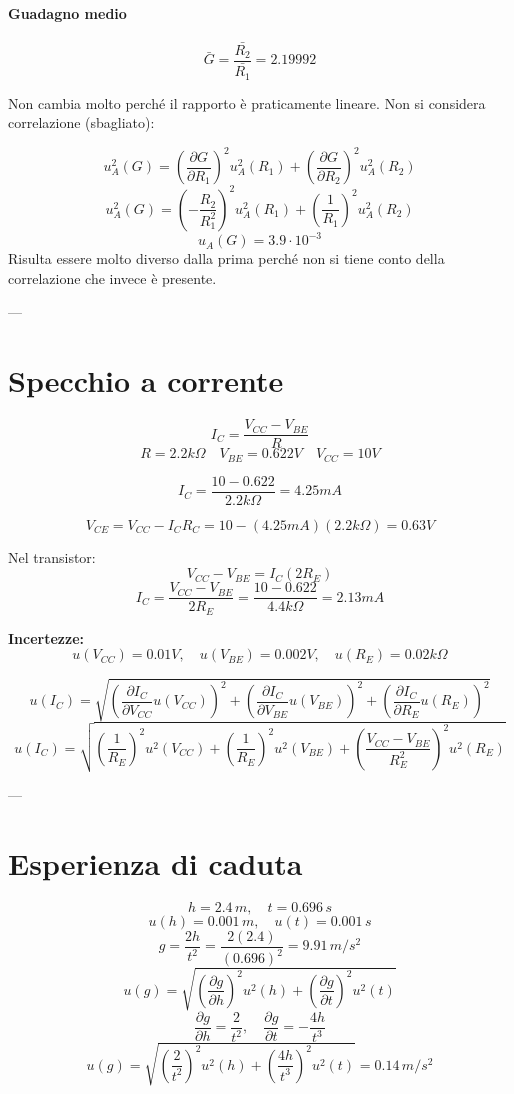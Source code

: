 \paragraph{Guadagno medio}
\[
\bar{G} = \frac{\bar{R_2}}{\bar{R_1}} = 2.19992
\]

Non cambia molto perché il rapporto è praticamente lineare.  
Non si considera correlazione (sbagliato):

\[
u_A^2(G) = \left( \frac{\partial G}{\partial R_1} \right)^2 u_A^2(R_1)
+ \left( \frac{\partial G}{\partial R_2} \right)^2 u_A^2(R_2)
\]
\[
u_A^2(G) = \left( -\frac{R_2}{R_1^2} \right)^2 u_A^2(R_1)
+ \left( \frac{1}{R_1} \right)^2 u_A^2(R_2)
\]
\[
u_A(G) = 3.9\cdot10^{-3}
\]
Risulta essere molto diverso dalla prima perché non si tiene conto della correlazione che invece è presente.





---

\section*{Specchio a corrente}

\[
I_C = \frac{V_{CC} - V_{BE}}{R}
\]
\[
R = 2.2k\Omega \quad V_{BE} = 0.622V \quad V_{CC} = 10V
\]

\[
I_C = \frac{10 - 0.622}{2.2k\Omega} = 4.25mA
\]

\[
V_{CE} = V_{CC} - I_C R_C = 10 - (4.25mA)(2.2k\Omega) = 0.63V
\]

\noindent
Nel transistor:
\[
V_{CC} - V_{BE} = I_C(2R_E)
\]
\[
I_C = \frac{V_{CC} - V_{BE}}{2R_E} = \frac{10 - 0.622}{4.4k\Omega} = 2.13mA
\]

\noindent
\textbf{Incertezze:}
\[
u(V_{CC}) = 0.01V, \quad u(V_{BE}) = 0.002V, \quad u(R_E) = 0.02k\Omega
\]

\[
u(I_C) = \sqrt{\left( \frac{\partial I_C}{\partial V_{CC}} u(V_{CC}) \right)^2 +
\left( \frac{\partial I_C}{\partial V_{BE}} u(V_{BE}) \right)^2 +
\left( \frac{\partial I_C}{\partial R_E} u(R_E) \right)^2}
\]
\[
u(I_C) = \sqrt{\left( \frac{1}{R_E} \right)^2 u^2(V_{CC}) +
\left( \frac{1}{R_E} \right)^2 u^2(V_{BE}) +
\left( \frac{V_{CC} - V_{BE}}{R_E^2} \right)^2 u^2(R_E)}
\]

---

\section*{Esperienza di caduta}

\[
h = 2.4\,m, \quad t = 0.696\,s
\]
\[
u(h) = 0.001\,m, \quad u(t) = 0.001\,s
\]
\[
g = \frac{2h}{t^2} = \frac{2(2.4)}{(0.696)^2} = 9.91\,m/s^2
\]
\[
u(g) = \sqrt{\left( \frac{\partial g}{\partial h} \right)^2 u^2(h) + \left( \frac{\partial g}{\partial t} \right)^2 u^2(t)}
\]
\[
\frac{\partial g}{\partial h} = \frac{2}{t^2}, \quad \frac{\partial g}{\partial t} = -\frac{4h}{t^3}
\]
\[
u(g) = \sqrt{\left( \frac{2}{t^2} \right)^2 u^2(h) + \left( \frac{4h}{t^3} \right)^2 u^2(t)} = 0.14\,m/s^2
\]

